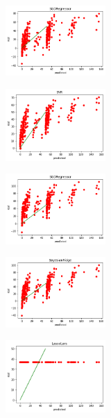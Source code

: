 \begin{figure}
\begin{subfigure}[t]{1.5in}
            \includegraphics[width=1.5in]{output_45_1.png}   
            \caption{}
        \end{subfigure}
    \medskip  %
        \begin{subfigure}[t]{1.5in}
            \centering
                \includegraphics[width=1.5in]{output_60_0.png}  
                \caption{}
        \end{subfigure}
        \begin{subfigure}[t]{1.5in}
            \centering
            \includegraphics[width=1.5in]{output_60_2.png} 
            \caption{}
        \end{subfigure}
        \begin{subfigure}[t]{1.5in}
            \centering
            \includegraphics[width=1.5in]{output_60_4.png}
            \caption{}
        \end{subfigure}
            \begin{subfigure}[t]{1.5in}
            \centering
            \includegraphics[width=1.5in]{output_60_6.png}
            \caption{}
        \end{subfigure}
        

\end{figure}
